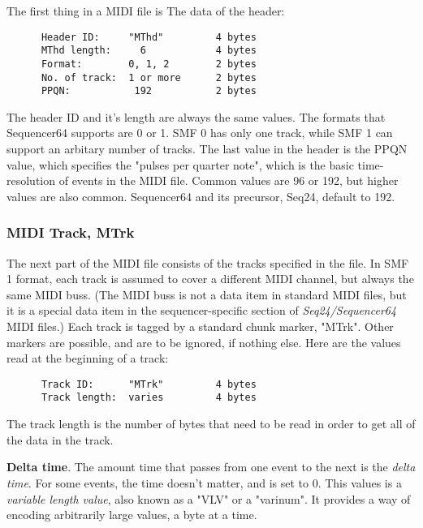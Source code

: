    The first thing in a MIDI file is The data of the header:

   \begin{verbatim}
      Header ID:     "MThd"         4 bytes
      MThd length:     6            4 bytes
      Format:        0, 1, 2        2 bytes
      No. of track:  1 or more      2 bytes
      PPQN:           192           2 bytes
   \end{verbatim}

   The header ID and it's length are always the same values.  The formats that
   Sequencer64 supports are 0 or 1.  SMF 0 has only one track, while SMF 1 can
   support an arbitary number of tracks.  The last value in the header is the
   PPQN value, which specifies the "pulses per quarter note", which is the
   basic time-resolution of events in the MIDI file.  Common values are 96 or
   192, but higher values are also common.  Sequencer64 and its precursor,
   Seq24, default to 192.

\subsubsection{MIDI Track, MTrk}
\label{subsubsec:midi_format_track}

   The next part of the MIDI file consists of the tracks specified in the file.
   In SMF 1 format, each track is assumed to cover a different MIDI channel,
   but always the same MIDI buss.  (The MIDI buss is not a data item in
   standard MIDI files, but it is a special data item in the sequencer-specific
   section of \textsl{Seq24/Sequencer64} MIDI files.)  Each track is tagged by
   a standard chunk marker, "MTrk".  Other markers are possible, and are to be
   ignored, if nothing else.  Here are the values read at the beginning of a
   track:

   \begin{verbatim}
      Track ID:      "MTrk"         4 bytes
      Track length:  varies         4 bytes
   \end{verbatim}

   The track length is the number of bytes that need to be read in order to get
   all of the data in the track.

   \textbf{Delta time}.
   The amount time that passes from one event to the next is the
   \textsl{delta time}.
   For some events, the time doesn't matter, and is set to 0.
   This values is a
   \textsl{variable length value}, also known as a "VLV" or a "varinum".   It
   provides a way of encoding arbitrarily large values, a byte at a time.

